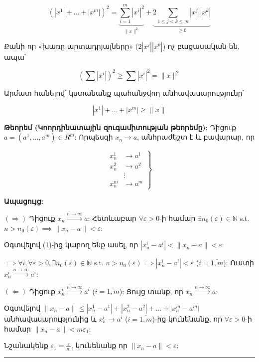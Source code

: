 \documentclass[12pt, a4paper]{article}
\begin{document}
$$
\left(|x^1| + \dots + |x^m|\right)^2 = \underbrace{\sum_{i=1}^m |x^i|^2}_{\|x\|^2} + \underbrace{2 \sum_{1 \le j < k \le m} |x^j||x^k|}_{\ge 0}
$$

Քանի որ «խառը արտադրյալները» ($2|x^j||x^k|$) ոչ բացասական են, ապա՝

$$
\left(\sum |x^i|\right)^2 \ge \sum |x^i|^2 = \|x\|^2
$$

Արմատ հանելով՝ կստանանք պահանջվող անհավասարությունը՝

$$
|x^1| + \dots + |x^m| \ge \|x\|
$$

\textbf{Թեորեմ (Կոորդինատային զուգամիտության թեորեմը)}։ Դիցուք $a = (a^1, \dots, a^m) \in R^m$: Որպեսզի $x_n \to a$, անհրաժեշտ է և բավարար, որ

\begin{equation}
\left. 
\begin{aligned} 
x_n^1 &\to a^1 \\ 
x_n^2 &\to a^2 \\ 
&\vdots \\ 
x_n^m &\to a^m 
\end{aligned} 
\right\} 
\tag{1.3}
\end{equation}

\textbf{Ապացույց:}

$(\Rightarrow)$ Դիցուք $x_n \overset{n \to \infty}{\longrightarrow} a$: Հետևաբար $\forall \varepsilon > 0$-ի համար $\exists n_0(\varepsilon) \in \mathbb{N}$ s.t. $n > n_0(\varepsilon) \implies \|x_n - a\| < \varepsilon$:

Օգտվելով (1)-ից կարող ենք ասել, որ $|x_n^i - a^i| < \|x_n - a\| < \varepsilon$:

$\implies \forall i, \forall \varepsilon > 0, \exists n_0(\varepsilon) \in \mathbb{N}$ s.t. $n > n_0(\varepsilon) \implies |x_n^i - a^i| < \varepsilon$ ($i = \overline{1, m}$): Ուստի $x_n^i \overset{n \to \infty}{\longrightarrow} a^i$:

$(\Leftarrow)$ Դիցուք $x_n^i \overset{n \to \infty}{\longrightarrow} a^i$ ($i = \overline{1, m}$): Ցույց տանք, որ $x_n \overset{n \to \infty}{\longrightarrow} a$:

Օգտվելով $\|x_n - a\| \le |x_n^1 - a^1| + |x_n^2 - a^2| + \dots + |x_n^m - a^m|$ անհավասարությունից և $x_n^i \to a^i$ ($i=\overline{1, m}$)-ից կունենանք, որ $\forall \varepsilon > 0$-ի համար $\|x_n - a\| < m \varepsilon_1$:

Նշանակենք $\varepsilon_1 = \frac{\varepsilon}{m}$, կունենանք որ $\|x_n - a\| < \varepsilon$:

\vspace{1em}
\hrule
\vspace{1em}
\end{document}
